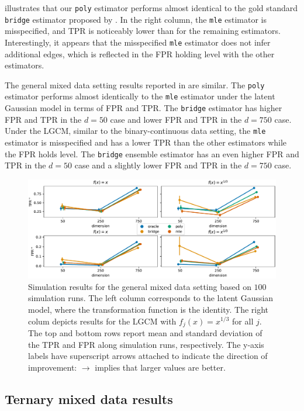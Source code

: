  illustrates that our \texttt{poly} estimator performs almost identical to the gold standard \texttt{bridge} estimator proposed by \citet{Fan17}. In the right column, the \texttt{mle} estimator is misspecified, and TPR is noticeably lower than for the remaining estimators. Interestingly, it appears that the misspecified \texttt{mle} estimator does not infer additional edges, which is reflected in the FPR holding level with the other estimators.

The general mixed data setting results reported in  are similar. The \texttt{poly} estimator performs almost identically to the \texttt{mle} estimator under the latent Gaussian model in terms of FPR and TPR. The \texttt{bridge} estimator has higher FPR and TPR in the \(d=50\) case and lower FPR and TPR in the \(d=750\) case. Under the LGCM, similar to the binary-continuous data setting, the \texttt{mle} estimator is misspecified and has a lower TPR than the other estimators while the FPR holds level. The \texttt{bridge} ensemble estimator has an even higher FPR and TPR in the \(d=50\) case and a slightly lower FPR and TPR in the \(d=750\) case.
\begin{figure}
    \centering
    \includegraphics[width=\textwidth]{Figures/general_fpr_tpr.pdf}
    \caption{Simulation results for the general mixed data setting based on \(100\) simulation runs. The left column corresponds to the latent Gaussian model, where the transformation function is the identity. The right colum depicts results for the LGCM with \(f_j(x) = x^{1/3}\) for all \(j\). The top and bottom rows report mean and standard deviation of the TPR and FPR along simulation runs, respectively. The y-axis labels have superscript arrows attached to indicate the direction of improvement: \(\rightarrow\) implies that larger values are better.}
    \label{fig:bench_tpr_fpr_general}
\end{figure}

\subsection{Ternary mixed data results}

